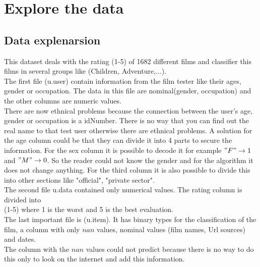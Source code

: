 \documentclass[11pt,a4paper]{article}
\begin{document}
\section{Explore the data}
\subsection{Data explenarsion}
This dataset deals with the rating (1-5) of 1682 different films and classifier this films in several groups like (Children, Adventure,...). \\The first file (u.user) contain information from the film tester like their ages, gender or occupation. The data in this file are nominal(gender, occupation) and the other columns are numeric values.\\ There are now ethnical problems because the connection between the user's age, gender or occupation is a idNumber. There is no way that you can find out the real name to that test user otherwise there are ethnical problems. A solution for the age column could be that they can divide it into 4 parts to secure the information. For the sex column it is possible to decode it for example $"F" \rightarrow 1$ and $"M" \rightarrow 0$. So the reader could not know the gender and for the algorithm it does not change anything. For the third column it is also possible to divide this into other sections like "official", "private sector".\\
The second file u.data contained only numerical values. The rating column is divided into \\(1-5) where 1 is the worst and 5 is the best evaluation.\\
The last important file is (u.item). It has binary types for the classification of the film, a column with only $nan$ values, nominal values (film names, Url sources) and dates.\\
The column with the $nan$ values could not predict because there is no way to do this only to look on the internet and add this information. 
\end{document}
